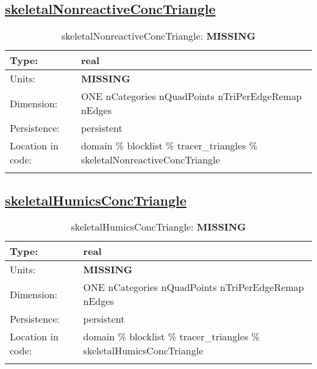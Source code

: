 \subsection[skeletalNonreactiveConcTriangle]{\hyperref[sec:var_tab_tracer_triangles]{skeletalNonreactiveConcTriangle}}
\label{subsec:var_sec_tracer_triangles_skeletalNonreactiveConcTriangle}
\begin{center}
\begin{longtable}{| p{2.0in} | p{4.0in} |}
        \hline 
        Type: & real \\
        \hline 
        Units: & {\bf \color{red} MISSING} \\
        \hline 
        Dimension: & ONE nCategories nQuadPoints nTriPerEdgeRemap nEdges \\
        \hline 
        Persistence: & persistent \\
        \hline 
         Location in code: & domain \% blocklist \% tracer\_triangles \% skeletalNonreactiveConcTriangle \\
         \hline 
    \caption{skeletalNonreactiveConcTriangle: {\bf \color{red} MISSING}}
\end{longtable}
\end{center}
\subsection[skeletalHumicsConcTriangle]{\hyperref[sec:var_tab_tracer_triangles]{skeletalHumicsConcTriangle}}
\label{subsec:var_sec_tracer_triangles_skeletalHumicsConcTriangle}
\begin{center}
\begin{longtable}{| p{2.0in} | p{4.0in} |}
        \hline 
        Type: & real \\
        \hline 
        Units: & {\bf \color{red} MISSING} \\
        \hline 
        Dimension: & ONE nCategories nQuadPoints nTriPerEdgeRemap nEdges \\
        \hline 
        Persistence: & persistent \\
        \hline 
         Location in code: & domain \% blocklist \% tracer\_triangles \% skeletalHumicsConcTriangle \\
         \hline 
    \caption{skeletalHumicsConcTriangle: {\bf \color{red} MISSING}}
\end{longtable}
\end{center}
